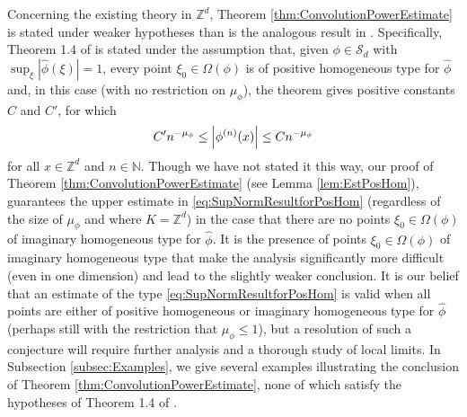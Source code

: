 \documentclass[smallextended]{svjour3}
\theoremstyle{remark}
\begin{document}
\noindent Concerning the existing theory in $\mathbb{Z}^d$, Theorem \ref{thm:ConvolutionPowerEstimate} is stated under weaker hypotheses than is the analogous result in \cite{randles_convolution_2017}. Specifically, Theorem 1.4 of \cite{randles_convolution_2017} is stated under the assumption that, given $\phi\in\mathcal{S}_d$ with $\sup_{\xi}|\widehat{\phi}(\xi)|=1$, every point $\xi_0\in\Omega(\phi)$ is of positive homogeneous type for $\widehat{\phi}$ and, in this case (with no restriction on $\mu_\phi$), the theorem gives positive constants $C$ and $C'$, for which
\begin{equation}\label{eq:SupNormResultforPosHom}
    C'n^{-\mu_\phi}\leq \abs{\phi^{(n)}(x)}\leq C n^{-\mu_\phi}
\end{equation}
for all $x\in\mathbb{Z}^d$ and $n\in\mathbb{N}$. Though we have not stated it this way, our proof of Theorem \ref{thm:ConvolutionPowerEstimate} (see Lemma \ref{lem:EstPosHom}), guarantees the upper estimate in \eqref{eq:SupNormResultforPosHom} (regardless of the size of $\mu_\phi$ and where $K=\mathbb{Z}^d$) in the case that there are no points $\xi_0\in\Omega(\phi)$ of imaginary homogeneous type for $\widehat{\phi}$. It is the presence of points $\xi_0\in\Omega(\phi)$ of imaginary homogeneous type that make the analysis significantly more difficult (even in one dimension) and lead to the slightly weaker conclusion. It is our belief that an estimate of the type \eqref{eq:SupNormResultforPosHom} is valid when all points are either of positive homogeneous or imaginary homogeneous type for $\widehat\phi$ (perhaps still with the restriction that $\mu_\phi\leq 1$), but a resolution of such a conjecture will require further analysis and a thorough study of local limits. In Subsection \ref{subsec:Examples}, we give several examples illustrating the conclusion of Theorem \ref{thm:ConvolutionPowerEstimate}, none of which satisfy the hypotheses of Theorem 1.4 of \cite{randles_convolution_2017}.\\
\end{document}
